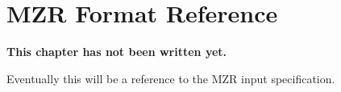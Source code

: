 \chapter{MZR Format Reference}

\bf{This chapter has not been written yet.}

Eventually this will be a reference to the MZR input specification.  